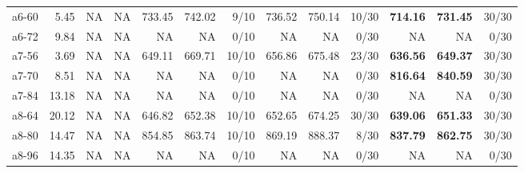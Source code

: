\documentclass[aspectratio=1610]{beamer}
\begin{document}
\begin{frame}
\begin{table}[]
{\begin{tabular}{lrrrrrrrrrrrr}
a6-60                                          & 5.45                                                         & NA      & \multicolumn{1}{r|}{NA}       & 733.45  & 742.02   & \multicolumn{1}{r|}{9/10}  & 736.52  & 750.14   & \multicolumn{1}{r|}{10/30} & \textbf{714.16}  & {\color[HTML]{FE0000} \textbf{731.45}}  & 30/30 \\
a6-72                                          & 9.84                                                         & NA      & \multicolumn{1}{r|}{NA}       & NA      & NA       & \multicolumn{1}{r|}{0/10}  & NA      & NA       & \multicolumn{1}{r|}{0/30}  & NA               & NA                                      & 0/30  \\
a7-56                                          & 3.69                                                         & NA      & \multicolumn{1}{r|}{NA}       & 649.11  & 669.71   & \multicolumn{1}{r|}{10/10} & 656.86  & 675.48   & \multicolumn{1}{r|}{23/30} & \textbf{636.56}  & {\color[HTML]{FE0000} \textbf{649.37}}  & 30/30 \\
a7-70                                          & 8.51                                                         & NA      & \multicolumn{1}{r|}{NA}       & NA      & NA       & \multicolumn{1}{r|}{0/10}  & NA      & NA       & \multicolumn{1}{r|}{0/30}  & \textbf{816.64}  & {\color[HTML]{FE0000} \textbf{840.59}}  & 30/30 \\
a7-84                                          & 13.18                                                        & NA      & \multicolumn{1}{r|}{NA}       & NA      & NA       & \multicolumn{1}{r|}{0/10}  & NA      & NA       & \multicolumn{1}{r|}{0/30}  & NA               & NA                                      & 0/30  \\
a8-64                                          & 20.12                                                        & NA      & \multicolumn{1}{r|}{NA}       & 646.82  & 652.38   & \multicolumn{1}{r|}{10/10} & 652.65  & 674.25   & \multicolumn{1}{r|}{30/30} & \textbf{639.06}  & {\color[HTML]{FE0000} \textbf{651.33}}  & 30/30 \\
a8-80                                          & 14.47                                                        & NA      & \multicolumn{1}{r|}{NA}       & 854.85  & 863.74   & \multicolumn{1}{r|}{10/10} & 869.19  & 888.37   & \multicolumn{1}{r|}{8/30}  & \textbf{837.79}  & {\color[HTML]{FE0000} \textbf{862.75}}  & 30/30 \\
a8-96                                          & 14.35                                                        & NA      & \multicolumn{1}{r|}{NA}       & NA      & NA       & \multicolumn{1}{r|}{0/10}  & NA      & NA       & \multicolumn{1}{r|}{0/30}  & NA               & NA                                      & 0/30  \\ \hline

\end{tabular}}
\end{table}
\end{frame}
\end{document}
